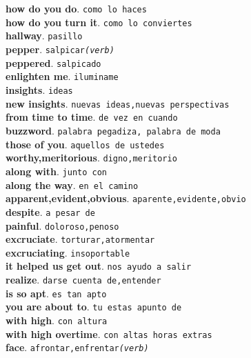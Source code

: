 \documentclass[twocolumn]{article}
\begin{document}
	\textsf{\textbf{how do you do}}. \texttt{como lo haces}\\
	\textsf{\textbf{how do you turn it}}. \texttt{como lo conviertes}\\
	\textsf{\textbf{hallway}}. \texttt{pasillo}\\
	\textsf{\textbf{pepper}}. \texttt{salpicar{\scriptsize \textsl{(verb)}}}\\
	\textsf{\textbf{peppered}}. \texttt{salpicado}\\
	\textsf{\textbf{enlighten me}}. \texttt{iluminame}\\
	\textsf{\textbf{insights}}. \texttt{ideas}\\
	\textsf{\textbf{new insights}}. \texttt{nuevas ideas,nuevas perspectivas}\\
	\textsf{\textbf{from time to time}}. \texttt{de vez en cuando}\\
	\textsf{\textbf{buzzword}}. \texttt{palabra pegadiza, palabra de moda}\\
	\textsf{\textbf{those of you}}. \texttt{aquellos de ustedes}\\
	\textsf{\textbf{worthy,meritorious}}. \texttt{digno,meritorio}\\
	\textsf{\textbf{along with}}. \texttt{junto con}\\
	\textsf{\textbf{along the way}}. \texttt{en el camino}\\
	\textsf{\textbf{apparent,evident,obvious}}. \texttt{aparente,evidente,obvio}\\
	\textsf{\textbf{despite}}. \texttt{a pesar de}\\
	\textsf{\textbf{painful}}. \texttt{doloroso,penoso}\\
	\textsf{\textbf{excruciate}}. \texttt{torturar,atormentar}\\
	\textsf{\textbf{excruciating}}. \texttt{insoportable}\\
	\textsf{\textbf{it helped us get out}}. \texttt{nos ayudo a salir}\\
	\textsf{\textbf{realize}}. \texttt{darse cuenta de,entender}\\
	\textsf{\textbf{is so apt}}. \texttt{es tan apto}\\
	\textsf{\textbf{you are about to}}. \texttt{tu estas apunto de}\\
	\textsf{\textbf{with high}}. \texttt{con altura}\\
	\textsf{\textbf{with high overtime}}. \texttt{con altas horas extras}\\
	\textsf{\textbf{face}}. \texttt{afrontar,enfrentar{\scriptsize \textsl{(verb)}}}\\
\end{document}
